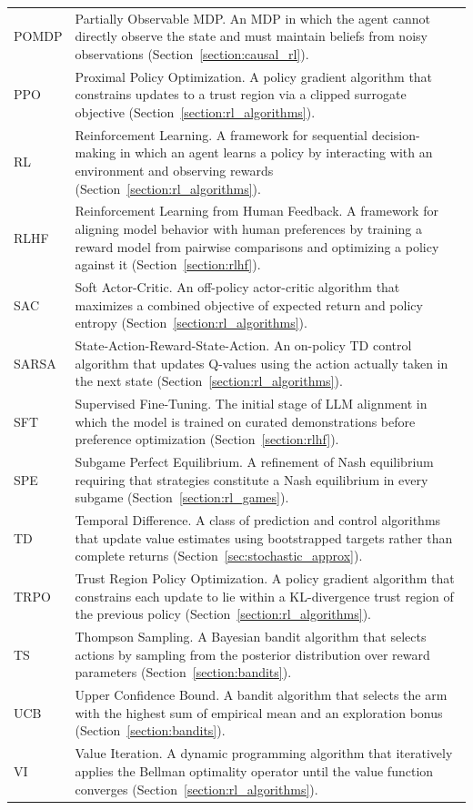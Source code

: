 \begin{longtable}{p{2.2cm} p{12cm}}
POMDP & Partially Observable MDP. An MDP in which the agent cannot directly observe the state and must maintain beliefs from noisy observations (Section~\ref{section:causal_rl}). \\[4pt]
PPO & Proximal Policy Optimization. A policy gradient algorithm that constrains updates to a trust region via a clipped surrogate objective (Section~\ref{section:rl_algorithms}). \\[4pt]
RL & Reinforcement Learning. A framework for sequential decision-making in which an agent learns a policy by interacting with an environment and observing rewards (Section~\ref{section:rl_algorithms}). \\[4pt]
RLHF & Reinforcement Learning from Human Feedback. A framework for aligning model behavior with human preferences by training a reward model from pairwise comparisons and optimizing a policy against it (Section~\ref{section:rlhf}). \\[4pt]
SAC & Soft Actor-Critic. An off-policy actor-critic algorithm that maximizes a combined objective of expected return and policy entropy (Section~\ref{section:rl_algorithms}). \\[4pt]
SARSA & State-Action-Reward-State-Action. An on-policy TD control algorithm that updates Q-values using the action actually taken in the next state (Section~\ref{section:rl_algorithms}). \\[4pt]
SFT & Supervised Fine-Tuning. The initial stage of LLM alignment in which the model is trained on curated demonstrations before preference optimization (Section~\ref{section:rlhf}). \\[4pt]
SPE & Subgame Perfect Equilibrium. A refinement of Nash equilibrium requiring that strategies constitute a Nash equilibrium in every subgame (Section~\ref{section:rl_games}). \\[4pt]
TD & Temporal Difference. A class of prediction and control algorithms that update value estimates using bootstrapped targets rather than complete returns (Section~\ref{sec:stochastic_approx}). \\[4pt]
TRPO & Trust Region Policy Optimization. A policy gradient algorithm that constrains each update to lie within a KL-divergence trust region of the previous policy (Section~\ref{section:rl_algorithms}). \\[4pt]
TS & Thompson Sampling. A Bayesian bandit algorithm that selects actions by sampling from the posterior distribution over reward parameters (Section~\ref{section:bandits}). \\[4pt]
UCB & Upper Confidence Bound. A bandit algorithm that selects the arm with the highest sum of empirical mean and an exploration bonus (Section~\ref{section:bandits}). \\[4pt]
VI & Value Iteration. A dynamic programming algorithm that iteratively applies the Bellman optimality operator until the value function converges (Section~\ref{section:rl_algorithms}). \\[4pt]
\end{longtable}
